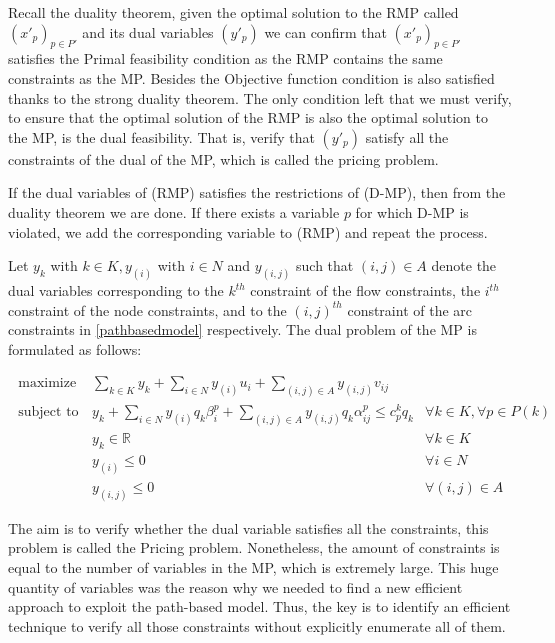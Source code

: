 Recall the duality theorem, given the optimal solution to the RMP called $(x'_{p})_{p\in P'}$ and its dual variables $(y'_{p})$
we can confirm that $(x'_{p})_{p\in P'}$ satisfies the Primal feasibility condition as the RMP contains
the same constraints as the MP. Besides the Objective function condition is also satisfied
thanks to the strong duality theorem. The only condition left that we must
verify, to ensure that the optimal solution of the RMP is also the optimal solution to
the MP, is the dual feasibility. That is, verify that $(y'_{p})$ satisfy all the constraints of the
dual of the MP, which is called the pricing problem. 

If the dual variables of (RMP) satisfies the restrictions of (D-MP), then from the duality theorem we are done.  If there exists a variable $p$ for which D-MP is violated, we add
the corresponding variable to (RMP) and repeat the process.

Let $y_{k}$ with $k \in K, y_{(i)}$ with $i \in N$ and $y_{(i, j)}$ such that $(i, j) \in A$ denote the dual variables corresponding to the $k^{t h}$ constraint of the flow constraints, the $i^{t h}$ constraint of the node constraints,  and to the $(i, j)^{t h}$ constraint of the arc constraints in \eqref{pathbasedmodel} respectively. The dual problem of the MP is formulated as follows: 

\begin{equation}\begin{array}{lll}
\text { maximize } & \sum_{k \in K} y_{k}+\sum_{i \in N} y_{(i)} u_{i}+\sum_{(i, j) \in A} y_{(i, j)} v_{i j} \\
\text { subject to } & y_{k}+\sum_{i \in N} y_{(i)} q_{k} \beta_{i}^{p}+\sum_{(i, j) \in A} y_{(i, j)} q_{k} \alpha_{i j}^{p} \leq c_{p}^{k} q_{k} & \forall k \in K, \forall p \in P(k) \\
& y_{k} \in \mathbb{R} & \forall k \in K \\
& y_{(i)} \leq 0 & \forall i \in N \\
& y_{(i, j)} \leq 0 & \forall(i, j) \in A
\end{array}\end{equation}

The aim is to verify whether the dual variable satisfies all the constraints, this problem is called the Pricing problem. Nonetheless, the amount of constraints is equal to the number of variables in the MP, which is extremely large. This huge quantity of variables was the reason why we needed to find a new efficient approach to exploit the path-based model. Thus, the key is to identify an efficient technique to verify all those constraints without explicitly enumerate all of them.

